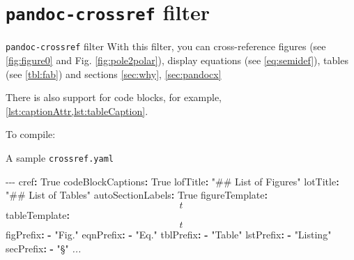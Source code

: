 \documentclass[
  10pt,
  ignorenonframetext,
  serif,onlymath]{beamer}
\newenvironment{Shaded}{}{}
\newcommand{\AttributeTok}[1]{\textcolor[rgb]{0.49,0.56,0.16}{#1}}
\newcommand{\CharTok}[1]{\textcolor[rgb]{0.25,0.44,0.63}{#1}}
\newcommand{\CommentTok}[1]{\textcolor[rgb]{0.38,0.63,0.69}{\textit{#1}}}
\newcommand{\DataTypeTok}[1]{\textcolor[rgb]{0.56,0.13,0.00}{#1}}
\newcommand{\ExtensionTok}[1]{#1}
\newcommand{\FunctionTok}[1]{\textcolor[rgb]{0.02,0.16,0.49}{#1}}
\newcommand{\KeywordTok}[1]{\textcolor[rgb]{0.00,0.44,0.13}{\textbf{#1}}}
\newcommand{\NormalTok}[1]{#1}
\newcommand{\PreprocessorTok}[1]{\textcolor[rgb]{0.74,0.48,0.00}{#1}}
\newcommand{\StringTok}[1]{\textcolor[rgb]{0.25,0.44,0.63}{#1}}
\begin{document}
\section{\texorpdfstring{\texttt{pandoc-crossref}
filter}{pandoc-crossref filter}}\label{pandoc-crossref-filter}

\begin{frame}[fragile]{\texttt{pandoc-crossref} filter}
\label{pandoc-crossref-filter-1}
With this filter, you can cross-reference figures (see
\cref{fig:figure0} and Fig. \ref{fig:pole2polar}), display equations
(see \cref{eq:semidef}), tables (see \cref{tbl:fab}) and sections
\cref{sec:why}, \cref{sec:pandocx}

There is also support for code blocks, for example,
\cref{lst:captionAttr,lst:tableCaption}.

To compile:

\begin{Shaded}
\end{Shaded}
\end{frame}

\begin{frame}[fragile]{A sample \texttt{crossref.yaml}}
\label{a-sample-crossref.yaml}
\scriptsize

\begin{Shaded}
\begin{Highlighting}[]
\PreprocessorTok{{-}{-}{-}}
\FunctionTok{cref}\KeywordTok{:}\AttributeTok{ }\CharTok{True}
\FunctionTok{codeBlockCaptions}\KeywordTok{:}\AttributeTok{ }\CharTok{True}
\FunctionTok{lofTitle}\KeywordTok{:}\AttributeTok{ }\StringTok{"\#\# List of Figures"}
\FunctionTok{lotTitle}\KeywordTok{:}\AttributeTok{ }\StringTok{"\#\# List of Tables"}
\FunctionTok{autoSectionLabels}\KeywordTok{:}\AttributeTok{ }\CharTok{True}
\FunctionTok{figureTemplate}\KeywordTok{:}\AttributeTok{ $$t$$}
\FunctionTok{tableTemplate}\KeywordTok{:}\AttributeTok{ $$t$$}
\FunctionTok{figPrefix}\KeywordTok{:}
\AttributeTok{  }\KeywordTok{{-}}\AttributeTok{ }\StringTok{"Fig."}
\FunctionTok{eqnPrefix}\KeywordTok{:}
\AttributeTok{  }\KeywordTok{{-}}\AttributeTok{ }\StringTok{"Eq."}
\FunctionTok{tblPrefix}\KeywordTok{:}
\AttributeTok{  }\KeywordTok{{-}}\AttributeTok{ }\StringTok{"Table"}
\FunctionTok{lstPrefix}\KeywordTok{:}
\AttributeTok{  }\KeywordTok{{-}}\AttributeTok{ }\StringTok{"Listing"}
\FunctionTok{secPrefix}\KeywordTok{:}
\AttributeTok{  }\KeywordTok{{-}}\AttributeTok{ }\StringTok{"§"}
\CommentTok{...}
\end{Highlighting}
\end{Shaded}
\end{frame}
\end{document}
